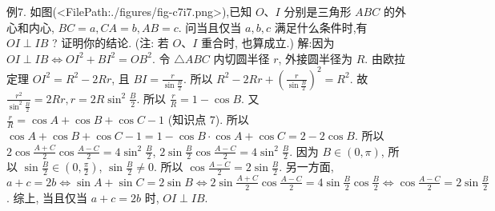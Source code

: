 例7. 如图(<FilePath:./figures/fig-c7i7.png>),已知 $O 、 I$ 分别是三角形 $A B C$ 的外心和内心, $B C=a, C A=b, A B=c$. 问当且仅当 $a, b, c$ 满足什么条件时,有 $O I \perp I B$ ? 证明你的结论.
(注: 若 $O 、 I$ 重合时, 也算成立.)
解:因为 $O I \perp I B \Leftrightarrow O I^2+B I^2=O B^2$. 令 $\triangle A B C$ 内切圆半径 $r$, 外接圆半径为 $R$. 由欧拉定理 $O I^2=R^2-2 R r$, 且 $B I=\frac{r}{\sin \frac{B}{2}}$. 所以 $R^2-2 R r+\left(\frac{r}{\sin \frac{B}{2}}\right)^2=R^2$. 故 $\frac{r^2}{\sin ^2 \frac{B}{2}}=2 R r, r=2 R \sin ^2 \frac{B}{2}$. 所以 $\frac{r}{R}=1-\cos B$. 又
$\frac{r}{R}=\cos A+\cos B+\cos C-1$ (知识点 7). 所以 $\cos A+\cos B+\cos C-1= 1-\cos B \cdot \cos A+\cos C=2-2 \cos B$. 所以 $2 \cos \frac{A+C}{2} \cos \frac{A-C}{2}=4 \sin ^2 \frac{B}{2}$, $2 \sin \frac{B}{2} \cos \frac{A-C}{2}=4 \sin ^2 \frac{B}{2}$. 因为 $B \in(0, \pi)$, 所以 $\sin \frac{B}{2} \in\left(0, \frac{\pi}{2}\right)$, $\sin \frac{B}{2} \neq 0$. 所以 $\cos \frac{A-C}{2}=2 \sin \frac{B}{2}$.
另一方面, $a+c=2 b \Leftrightarrow \sin A+\sin C=2 \sin B \Leftrightarrow 2 \sin \frac{A+C}{2} \cos \frac{A-C}{2}= 4 \sin \frac{B}{2} \cos \frac{B}{2} \Leftrightarrow \cos \frac{A-C}{2}=2 \sin \frac{B}{2}$. 综上, 当且仅当 $a+c=2 b$ 时, $O I \perp I B$.



